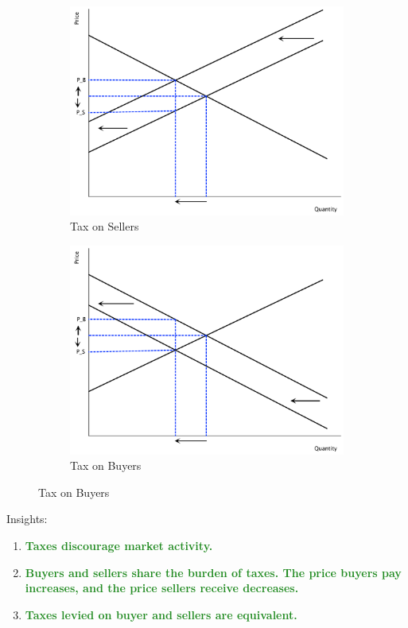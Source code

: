 \documentclass[11pt]{article}\usepackage[]{graphicx}\usepackage[]{color}
\theoremstyle{definition}
\newcommand{\ddp}[1]{{\textbf{\textcolor{ForestGreen}{#1}}}}
\begin{document}
		\begin{figure}[H]
			\centering
			\caption{Taxes}
			\begin{subfigure}{.5\textwidth}
				\includegraphics[scale=.25]{plot40.pdf}
				\caption{Tax on Sellers}
			\end{subfigure}%
			\begin{subfigure}{.5\textwidth}
				\centering
				\includegraphics[scale=.25]{plot41.pdf}
				\caption{Tax on Buyers}
			\end{subfigure}
		\end{figure}
	
	Insights:
	\begin{enumerate}
		\setlength{\itemsep}{15pt}
		\item \ddp{Taxes discourage market activity.}
		\item \ddp{Buyers and sellers share the burden of taxes. The price buyers pay increases, and the price sellers receive decreases.}
		\item \ddp{Taxes levied on buyer and sellers are equivalent.}
	\end{enumerate}
	
\end{document}
